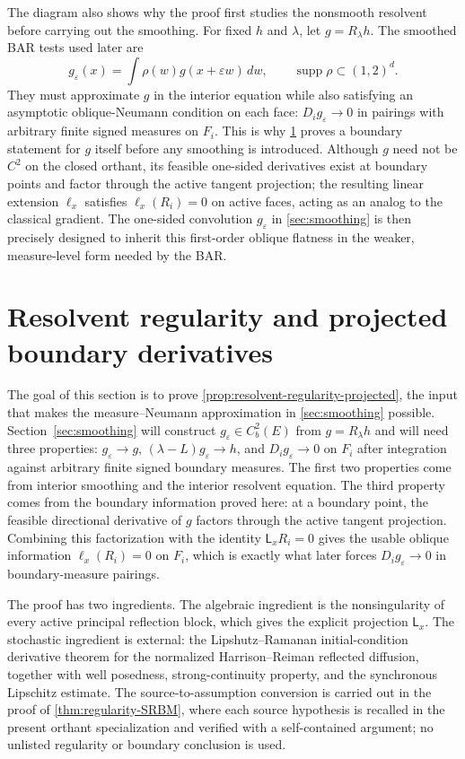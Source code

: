 \documentclass[aihp]{imsart}
\numberwithin{equation}{section}
\theoremstyle{plain}
\theoremstyle{definition}
\newcommand{\supp}{\operatorname{supp}}
\newcommand{\1}{\mathbf 1}
\begin{document}
The diagram also shows why the proof first studies the nonsmooth resolvent before carrying out the smoothing.  For fixed $h$ and $\lambda$, let $g=R_\lambda h$.  The smoothed BAR tests used later are
\[
        g_\varepsilon(x)=\int \rho(w)g(x+\varepsilon w)\,dw,
        \qquad \supp\rho\subset(1,2)^d.
\]
They must approximate $g$ in the interior equation while also satisfying an asymptotic oblique-Neumann condition on each face: $D_i g_\varepsilon\to0$ in pairings with arbitrary finite signed measures on $F_i$.  This is why \cref{sec:resolvent-regularity} proves a boundary statement for $g$ itself before any smoothing is introduced.  Although $g$ need not be $C^2$ on the closed orthant, its feasible one-sided derivatives exist at boundary points and factor through the active tangent projection; the resulting linear extension $\ell_x$ satisfies $\ell_x(R_i)=0$ on active faces, acting as an analog to the classical gradient.  The one-sided convolution $g_\varepsilon$ in \cref{sec:smoothing} is then precisely designed to inherit this first-order oblique flatness in the weaker, measure-level form needed by the BAR.


\section{Resolvent regularity and projected boundary derivatives}\label{sec:resolvent-regularity}

The goal of this section is to prove \cref{prop:resolvent-regularity-projected}, the input that makes the measure--Neumann approximation in \cref{sec:smoothing} possible.  Section~\ref{sec:smoothing} will construct $g_\varepsilon\in C_b^2(E)$ from $g=R_\lambda h$ and will need three properties: $g_\varepsilon\to g$, $(\lambda-L)g_\varepsilon\to h$, and $D_i g_\varepsilon\to0$ on $F_i$ after integration against arbitrary finite signed boundary measures.  The first two properties come from interior smoothing and the interior resolvent equation.  The third property comes from the boundary information proved here: at a boundary point, the feasible directional derivative of $g$ factors through the active tangent projection.  Combining this factorization with the identity $\mathsf L_xR_i=0$ gives the usable oblique information $\ell_x(R_i)=0$ on $F_i$, which is exactly what later forces $D_i g_\varepsilon\to0$ in boundary-measure pairings.

The proof has two ingredients.  The algebraic ingredient is the nonsingularity of every active principal reflection block, which gives the explicit projection $\mathsf L_x$.  The stochastic ingredient is external: the Lipshutz--Ramanan initial-condition derivative theorem for the normalized Harrison--Reiman reflected diffusion, together with well posedness, strong-continuity property, and the synchronous Lipschitz estimate.  The source-to-assumption conversion is carried out in the proof of \cref{thm:regularity-SRBM}, where each source hypothesis is recalled in the present orthant specialization and verified with a self-contained argument; no unlisted regularity or boundary conclusion is used.
\end{document}
